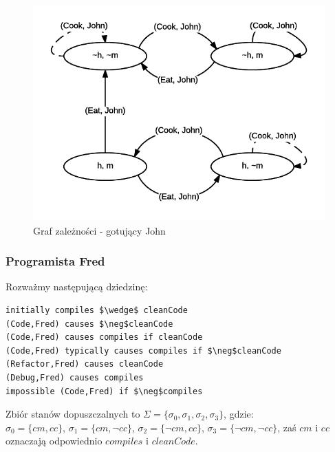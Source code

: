 \documentclass{article}
\begin{document}
\begin{figure}[H]
\centering
\includegraphics[scale=1]{John}
\caption{Graf zależności - gotujący John}
\end{figure}


\subsubsection{Programista Fred}

Rozważmy następującą dziedzinę:
\bigskip
{}
\begin{lstlisting}[mathescape=true]
initially compiles $\wedge$ cleanCode
(Code,Fred) causes $\neg$cleanCode
(Code,Fred) causes compiles if cleanCode
(Code,Fred) typically causes compiles if $\neg$cleanCode
(Refactor,Fred) causes cleanCode
(Debug,Fred) causes compiles
impossible (Code,Fred) if $\neg$compiles
\end{lstlisting}
Zbiór stanów dopuszczalnych to $\Sigma=\{\sigma_{0},\sigma_{1},\sigma_{2},\sigma_{3}\}$, gdzie:\\
$\sigma_{0}=\{cm,cc\}$, $\sigma_{1}=\{cm,\neg cc\}$, $\sigma_{2}=\{\neg cm,cc\}$, $\sigma_{3}=\{\neg cm,\neg cc\}$, zaś $cm$ i $cc$ oznaczają odpowiednio $compiles$ i $cleanCode$.\\
\end{document}
